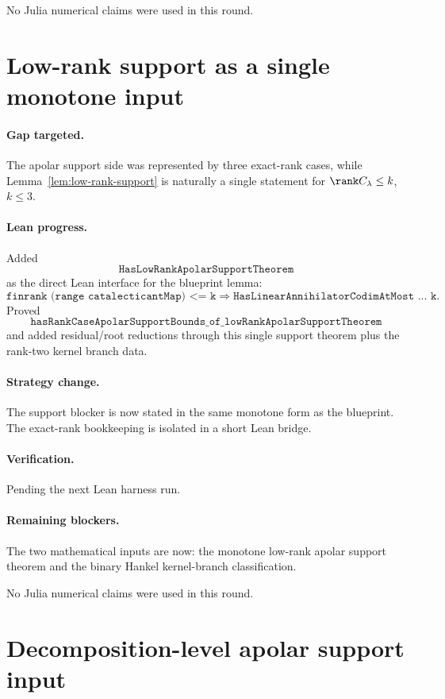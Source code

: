 \documentclass[11pt]{article}
\begin{document}
No Julia numerical claims were used in this round.

\section*{Low-rank support as a single monotone input}

\paragraph{Gap targeted.}
The apolar support side was represented by three exact-rank cases, while
Lemma~\ref{lem:low-rank-support} is naturally a single statement for
\(\rank C_\lambda\le k\), \(k\le3\).

\paragraph{Lean progress.}
Added
\[
\texttt{HasLowRankApolarSupportTheorem}
\]
as the direct Lean interface for the blueprint lemma:
\[
\texttt{finrank (range catalecticantMap) <= k}
\Rightarrow
\texttt{HasLinearAnnihilatorCodimAtMost ... k}.
\]
Proved
\[
\texttt{hasRankCaseApolarSupportBounds\_of\_lowRankApolarSupportTheorem}
\]
and added residual/root reductions through this single support theorem plus
the rank-two kernel branch data.

\paragraph{Strategy change.}
The support blocker is now stated in the same monotone form as the blueprint.
The exact-rank bookkeeping is isolated in a short Lean bridge.

\paragraph{Verification.}
Pending the next Lean harness run.

\paragraph{Remaining blockers.}
The two mathematical inputs are now:
the monotone low-rank apolar support theorem and the binary Hankel
kernel-branch classification.

No Julia numerical claims were used in this round.

\section*{Decomposition-level apolar support input}
\end{document}
